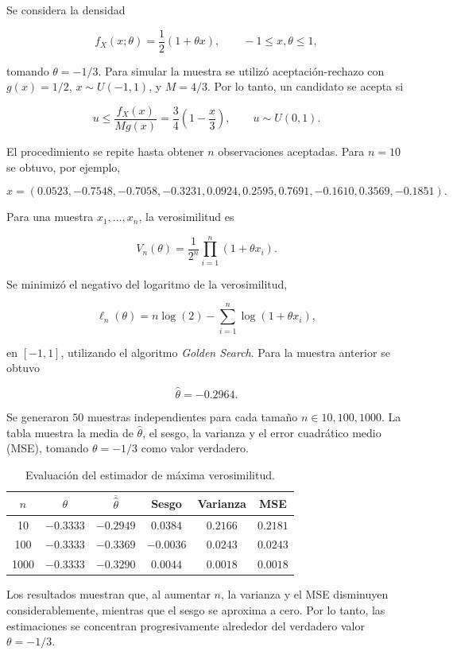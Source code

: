 \documentclass[10pt,a4paper]{article}
\begin{document}
Se considera la densidad

$$
f_X(x;\theta)=\frac{1}{2}(1+\theta x),\qquad -1\leq x,\theta\leq1,
$$

tomando $\theta=-1/3$. Para simular la muestra se utilizó aceptación-rechazo con $g(x)=1/2$, $x\sim U(-1,1)$, y $M=4/3$. Por lo tanto, un candidato se acepta si

$$
u\leq\frac{f_X(x)}{Mg(x)}
=\frac{3}{4}\left(1-\frac{x}{3}\right),\qquad u\sim U(0,1).
$$

El procedimiento se repite hasta obtener $n$ observaciones aceptadas. Para $n=10$ se obtuvo, por ejemplo,

$$
x=(0.0523,-0.7548,-0.7058,-0.3231,0.0924,0.2595,
0.7691,-0.1610,0.3569,-0.1851).
$$

Para una muestra $x_1,\ldots,x_n$, la verosimilitud es

$$
V_n(\theta)=\frac{1}{2^n}\prod_{i=1}^n(1+\theta x_i).
$$

Se minimizó el negativo del logaritmo de la verosimilitud,

$$
\ell_n(\theta)=n\log(2)-\sum_{i=1}^n\log(1+\theta x_i),
$$

en $[-1,1]$, utilizando el algoritmo \textit{Golden Search}. Para la muestra anterior se obtuvo

$$
\boxed{\hat{\theta}=-0.2964}.
$$

Se generaron $50$ muestras independientes para cada tamaño $n\in{10,100,1000}$. La tabla muestra la media de $\hat{\theta}$, el sesgo, la varianza y el error cuadrático medio (MSE), tomando $\theta=-1/3$ como valor verdadero.

\begin{table}[htbp]
\centering
\caption{Evaluación del estimador de máxima verosimilitud.}
\label{tab:resultados_n}
\small
\begin{tabular}{cccccc}
\toprule
$n$ & $\theta$ & $\overline{\hat{\theta}}$ & Sesgo & Varianza & MSE \\
\midrule
10   & $-0.3333$ & $-0.2949$ & $0.0384$  & $0.2166$ & $0.2181$ \\
100  & $-0.3333$ & $-0.3369$ & $-0.0036$ & $0.0243$ & $0.0243$ \\
1000 & $-0.3333$ & $-0.3290$ & $0.0044$  & $0.0018$ & $0.0018$ \\
\bottomrule
\end{tabular}
\end{table}

Los resultados muestran que, al aumentar $n$, la varianza y el MSE disminuyen considerablemente, mientras que el sesgo se aproxima a cero. Por lo tanto, las estimaciones se concentran progresivamente alrededor del verdadero valor $\theta=-1/3$.
\end{document}
